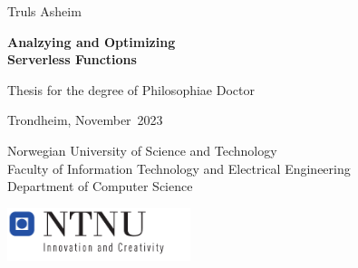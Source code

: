 \documentclass[../main.tex]{subfiles}
\begin{document}
\frontmatter
{
\sffamily
\parindent=0cm
\renewcommand{\headrulewidth}{0pt}
\addtolength{\parskip}{\baselineskip}
{\huge {Truls Asheim}}
\vspace{2cm}

{\textbf {\fontsize{27}{32}\selectfont Analzying and Optimizing\\ Serverless Functions}}

{\LARGE }
\vspace{5cm}

{\Large Thesis for the degree of Philosophiae Doctor

Trondheim, November\ 2023

Norwegian University of Science and Technology \\
Faculty of Information Technology and Electrical Engineering \\
Department of Computer Science}
\vspace{5cm}

\includegraphics[width=0.4\textwidth]{../images/NTNUlogo.pdf}

\newpage
}
\end{document}
